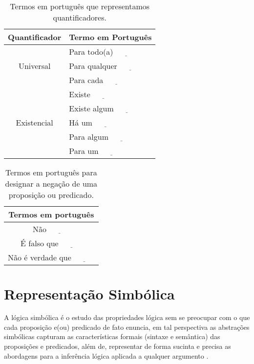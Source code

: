 \begin{table}[h]
	\centering
	\begin{tabular}{cl}
		\hline
		\textbf{Quantificador} & \textbf{Termo em Portugu\^es} \\ \hline
		\multirow{3}{*}{Universal} & Para todo(a) $\underline{ \ \ \ \ \ \ \ \ \ \ \ \ }$\\
		& Para qualquer $\underline{ \ \ \ \ \ \ \ \ \ \ \ \ }$\\
		& Para cada $\underline{ \ \ \ \ \ \ \ \ \ \ \ \ }$\\ \hline
		\multirow{5}{*}{Existencial} & Existe $\underline{ \ \ \ \ \ \ \ \ \ \ \ \ }$\\
		& Existe algum $\underline{ \ \ \ \ \ \ \ \ \ \ \ \ }$\\
		& Há um $\underline{ \ \ \ \ \ \ \ \ \ \ \ \ }$\\
		& Para algum $\underline{ \ \ \ \ \ \ \ \ \ \ \ \ }$\\
		& Para um $\underline{ \ \ \ \ \ \ \ \ \ \ \ \ }$\\ \hline
	\end{tabular}
	\caption{Termos em português que representamos quantificadores.}
	\label{tab:QuantificadoresPT-BR}
\end{table}

\begin{table}[h]
	\centering
	\begin{tabular}{c}
		\hline
		\textbf{Termos em português}\\
		\hline
		Não $\underline{ \ \ \ \ \ \ \ \ \ \ \ \ }$ \\
		É falso que $\underline{ \ \ \ \ \ \ \ \ \ \ \ \ }$\\
		Não é verdade que $\underline{ \ \ \ \ \ \ \ \ \ \ \ \ }$ \\ \hline
	\end{tabular}
	\caption{Termos em português para designar a negação de uma proposição ou predicado.}
	\label{tab:NegacaoPortugues}
\end{table}

\section{Representação Simbólica}\label{sec:LogicsSimbolic}

A lógica simbólica é o estudo das propriedades lógica sem se preocupar com o que cada proposição e(ou) predicado de fato enuncia, em tal perspectiva as abstrações simbólicas capturam as características formais (sintaxe e semântica) das proposições e predicados, além de, representar de forma sucinta e precisa as abordagens para a inferência lógica aplicada a qualquer argumento \cite{russel1910principia, hamilton1988logic}.

